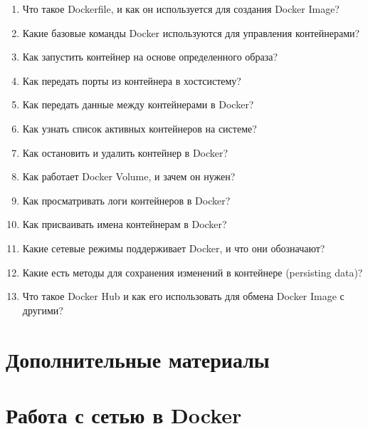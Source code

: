 \documentclass[letterpaper,10pt,russian]{sphinxmanual}
\begin{document}
\begin{enumerate}
\item {} 
\sphinxAtStartPar
Что такое Dockerfile, и как он используется для создания Docker Image?

\item {} 
\sphinxAtStartPar
Какие базовые команды Docker используются для управления контейнерами?

\item {} 
\sphinxAtStartPar
Как запустить контейнер на основе определенного образа?

\item {} 
\sphinxAtStartPar
Как передать порты из контейнера в хост\sphinxhyphen{}систему?

\item {} 
\sphinxAtStartPar
Как передать данные между контейнерами в Docker?

\item {} 
\sphinxAtStartPar
Как узнать список активных контейнеров на системе?

\item {} 
\sphinxAtStartPar
Как остановить и удалить контейнер в Docker?

\item {} 
\sphinxAtStartPar
Как работает Docker Volume, и зачем он нужен?

\item {} 
\sphinxAtStartPar
Как просматривать логи контейнеров в Docker?

\item {} 
\sphinxAtStartPar
Как присваивать имена контейнерам в Docker?

\item {} 
\sphinxAtStartPar
Какие сетевые режимы поддерживает Docker, и что они обозначают?

\item {} 
\sphinxAtStartPar
Какие есть методы для сохранения изменений в контейнере (persisting data)?

\item {} 
\sphinxAtStartPar
Что такое Docker Hub и как его использовать для обмена Docker Image с другими?

\end{enumerate}


\chapter{Дополнительные материалы}
\label{\detokenize{index:id17}}

\chapter{Работа с сетью в Docker}
\label{\detokenize{index:id18}}
\sphinxstepscope
\end{document}
